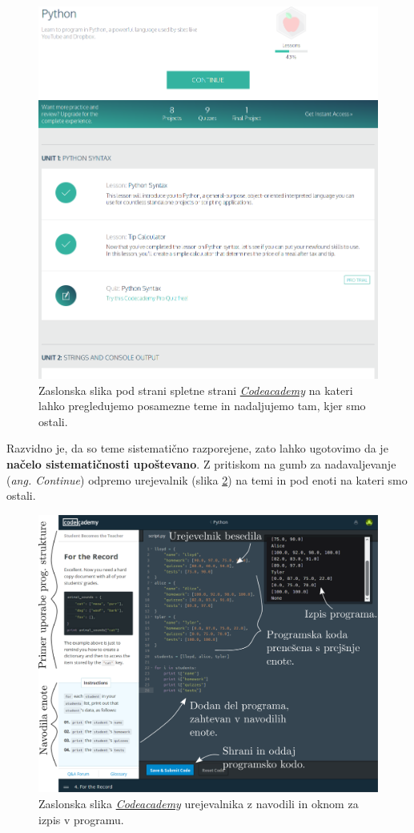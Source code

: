 \begin{figure}[h!]
  \centering
    \includegraphics [width=0.65\linewidth, keepaspectratio =
    1] {./images/sc_web/codeacademy_tema_01.png}
    \caption{Zaslonska slika pod strani spletne strani
      \emph{\href{https://www.codecademy.com/}{Codeacademy}}
      \cite{web:codeacademy} na kateri lahko pregledujemo posamezne
      teme in nadaljujemo tam, kjer smo ostali.}
    \label{fig:scr:web:codeacademy:tema}
\end{figure}

Razvidno je, da so teme sistematično razporejene, zato lahko ugotovimo
da je \textbf{načelo sistematičnosti upoštevano}. Z pritiskom na gumb
za nadavaljevanje (\emph{ang. Continue}) odpremo urejevalnik (slika
\ref{fig:scr:web:codeacademy:ide}) na temi in pod enoti na kateri smo
ostali.

\begin{figure}[h!]
  \centering
    \includegraphics [width=0.65\linewidth, keepaspectratio =
   1] {./images/sc_web/codeacademy_IDE_02.png}
   \caption{Zaslonska slika
     \emph{\href{https://www.codecademy.com/}{Codeacademy}}
     \cite{web:codeacademy} urejevalnika z navodili in oknom za izpis
     v programu.}
    \label{fig:scr:web:codeacademy:ide}
\end{figure}

